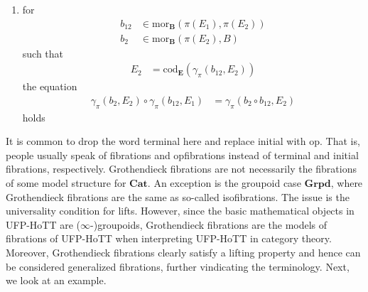 \begin{enumerate}
\begin{enumerate}
holds
\item[(IS2)]
for
\begin{align*}
  b_{12}
  &\in
  \mathrm{mor}_{\mathbf{B}}
  \left(
    \pi(E_{1}),
    \pi(E_{2})
  \right)
  \\
  b_{2}
  &\in
  \mathrm{mor}_{\mathbf{B}}
  \left(
    \pi(E_{2}),
    B
  \right)
\end{align*}
such that
\begin{align*}
  E_{2}
  &=
  \mathrm{cod}_{\mathbf{E}}
  \left(
    \gamma_{\pi}(b_{12},E_{2})
  \right)
\end{align*}
the equation
\begin{align*}
  \gamma_{\pi}(b_{2},E_{2})
  \circ
  \gamma_{\pi}(b_{12},E_{1})
  &=
  \gamma_{\pi}(b_{2} \circ b_{12},E_{2})
\end{align*}
holds
\end{enumerate}
\end{enumerate}
It is common to drop the word {\glqq}terminal{\grqq} here and replace {\glqq}initial{\grqq} with {\glqq}op{\grqq}.
That is, people usually speak of fibrations and opfibrations instead of terminal and initial fibrations, respectively.
Grothendieck fibrations are not necessarily the fibrations of some model structure for $\mathbf{Cat}$.
An exception is the groupoid case $\mathbf{Grpd}$, where Grothendieck fibrations are the same as so-called isofibrations.
The issue is the universality condition for lifts.
However, since the basic mathematical objects in UFP-HoTT are ($\infty$-)groupoids, Grothendieck fibrations are the models of fibrations of UFP-HoTT when interpreting UFP-HoTT in category theory.
Moreover, Grothendieck fibrations clearly satisfy a lifting property and hence can be considered generalized fibrations, further vindicating the terminology.
Next, we look at an example.
\\
